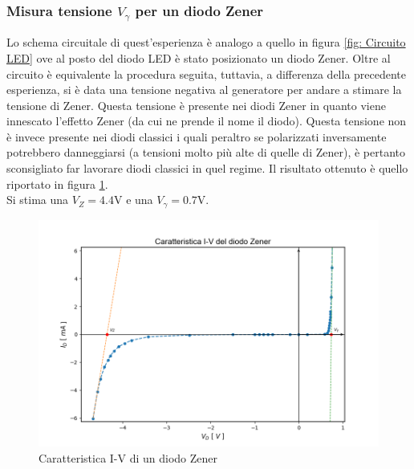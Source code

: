 \subsubsection{Misura tensione $V_\gamma$ per un diodo Zener}
Lo schema circuitale di quest'esperienza è analogo a quello in figura \ref{fig: Circuito LED} ove al posto del diodo LED è stato posizionato un diodo Zener. Oltre al circuito è equivalente la procedura seguita, tuttavia, a differenza della precedente esperienza, si è data una tensione negativa al generatore per andare a stimare la tensione di Zener. Questa tensione è presente nei diodi Zener in quanto viene innescato l'effetto Zener (da cui ne prende il nome il diodo). Questa tensione non è invece presente nei diodi classici i quali peraltro se polarizzati inversamente potrebbero danneggiarsi (a tensioni molto più alte di quelle di Zener), è pertanto sconsigliato far lavorare diodi classici in quel regime. Il risultato ottenuto è quello riportato in figura \ref{Zener}.\\
Si stima una $V_Z=4.4\unit{\V}$ e una $V_{\gamma}=0.7\unit{\V}$.
\begin{figure}
    \centering
    \includegraphics[scale=0.55]{Caratteristica zener.png}
    \caption{Caratteristica I-V di un diodo Zener}
    \label{Zener}
\end{figure}
